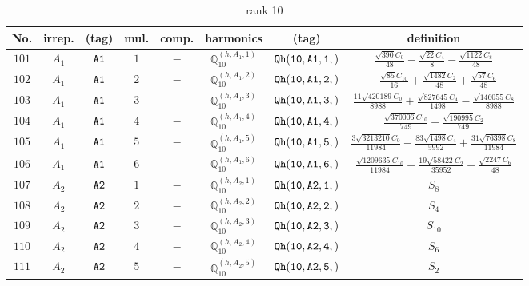 \documentclass[fleqn,8pt]{jsarticle}
\begin{document}
\begin{table}[ht!]
\begin{center}
\caption{rank 10}
\renewcommand{\arraystretch}{1.3}
\begin{tabular}{cccccccc} \hline \hline
No. & irrep. & (tag) & mul. & comp. & harmonics & (tag) & definition \\ \hline
$ 101 $ & $ A_{1} $ & $ {\tt A1} $ & $ 1 $ & $ - $ & $ \mathbb{Q}_{10}^{(h,A_{1},1)} $ & $ {\tt Qh(10,A1,1,)} $ & $ \frac{\sqrt{390} C_{0}}{48} - \frac{\sqrt{22} C_{4}}{8} - \frac{\sqrt{1122} C_{8}}{48} $ \\
$ 102 $ & $ A_{1} $ & $ {\tt A1} $ & $ 2 $ & $ - $ & $ \mathbb{Q}_{10}^{(h,A_{1},2)} $ & $ {\tt Qh(10,A1,2,)} $ & $ - \frac{\sqrt{85} C_{10}}{16} + \frac{\sqrt{1482} C_{2}}{48} + \frac{\sqrt{57} C_{6}}{48} $ \\
$ 103 $ & $ A_{1} $ & $ {\tt A1} $ & $ 3 $ & $ - $ & $ \mathbb{Q}_{10}^{(h,A_{1},3)} $ & $ {\tt Qh(10,A1,3,)} $ & $ \frac{11 \sqrt{420189} C_{0}}{8988} + \frac{\sqrt{827645} C_{4}}{1498} - \frac{\sqrt{146055} C_{8}}{8988} $ \\
$ 104 $ & $ A_{1} $ & $ {\tt A1} $ & $ 4 $ & $ - $ & $ \mathbb{Q}_{10}^{(h,A_{1},4)} $ & $ {\tt Qh(10,A1,4,)} $ & $ \frac{\sqrt{370006} C_{10}}{749} + \frac{\sqrt{190995} C_{2}}{749} $ \\
$ 105 $ & $ A_{1} $ & $ {\tt A1} $ & $ 5 $ & $ - $ & $ \mathbb{Q}_{10}^{(h,A_{1},5)} $ & $ {\tt Qh(10,A1,5,)} $ & $ \frac{3 \sqrt{3213210} C_{0}}{11984} - \frac{83 \sqrt{1498} C_{4}}{5992} + \frac{31 \sqrt{76398} C_{8}}{11984} $ \\
$ 106 $ & $ A_{1} $ & $ {\tt A1} $ & $ 6 $ & $ - $ & $ \mathbb{Q}_{10}^{(h,A_{1},6)} $ & $ {\tt Qh(10,A1,6,)} $ & $ \frac{\sqrt{1209635} C_{10}}{11984} - \frac{19 \sqrt{58422} C_{2}}{35952} + \frac{\sqrt{2247} C_{6}}{48} $ \\
$ 107 $ & $ A_{2} $ & $ {\tt A2} $ & $ 1 $ & $ - $ & $ \mathbb{Q}_{10}^{(h,A_{2},1)} $ & $ {\tt Qh(10,A2,1,)} $ & $ S_{8} $ \\
$ 108 $ & $ A_{2} $ & $ {\tt A2} $ & $ 2 $ & $ - $ & $ \mathbb{Q}_{10}^{(h,A_{2},2)} $ & $ {\tt Qh(10,A2,2,)} $ & $ S_{4} $ \\
$ 109 $ & $ A_{2} $ & $ {\tt A2} $ & $ 3 $ & $ - $ & $ \mathbb{Q}_{10}^{(h,A_{2},3)} $ & $ {\tt Qh(10,A2,3,)} $ & $ S_{10} $ \\
$ 110 $ & $ A_{2} $ & $ {\tt A2} $ & $ 4 $ & $ - $ & $ \mathbb{Q}_{10}^{(h,A_{2},4)} $ & $ {\tt Qh(10,A2,4,)} $ & $ S_{6} $ \\
$ 111 $ & $ A_{2} $ & $ {\tt A2} $ & $ 5 $ & $ - $ & $ \mathbb{Q}_{10}^{(h,A_{2},5)} $ & $ {\tt Qh(10,A2,5,)} $ & $ S_{2} $ \\

\end{tabular}
\end{center}
\end{table}
\end{document}
